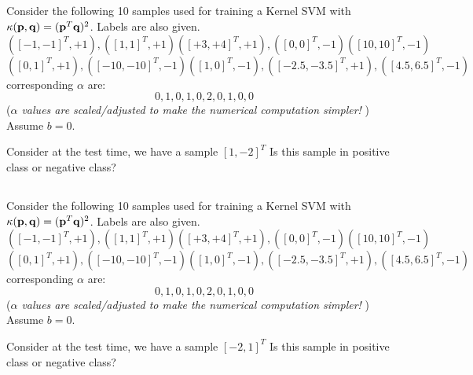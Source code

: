 \begin{frame}
\section{}
Consider the following 10 samples used for training a Kernel SVM with $\kappa({\bf p}, {\bf q}) = ({\bf p}^T{\bf q})^2$.  Labels are also given.
\[ ([-1,-1]^T,+1), ([1,1]^T, +1) ([+3,+4]^T, +1), ([0,0]^T,-1) ([10,10]^T,-1) \]
\[ ([0,1]^T,+1), ([-10,-10]^T,-1) ([1,0]^T,-1),([-2.5,-3.5]^T,+1), ([4.5,6.5]^T,-1) \]
corresponding $\alpha$ are:
\[ 0,1,0,1,0,2,0,1,0,0\]
({\em $\alpha$ values are scaled/adjusted to make the numerical computation simpler!} )
Assume $b=0$.

Consider at the test time, we have a sample $[1, -2]^T$
Is this sample in positive class or negative class?



\end{frame}


\begin{frame}
\section{}
Consider the following 10 samples used for training a Kernel SVM with $\kappa({\bf p}, {\bf q}) = ({\bf p}^T{\bf q})^2$.  Labels are also given.
\[ ([-1,-1]^T,+1), ([1,1]^T, +1) ([+3,+4]^T, +1), ([0,0]^T,-1) ([10,10]^T,-1) \]
\[ ([0,1]^T,+1), ([-10,-10]^T,-1) ([1,0]^T,-1),([-2.5,-3.5]^T,+1), ([4.5,6.5]^T,-1) \]
corresponding $\alpha$ are:
\[ 0,1,0,1,0,2,0,1,0,0\]
({\em $\alpha$ values are scaled/adjusted to make the numerical computation simpler!} )
Assume $b=0$.

Consider at the test time, we have a sample $[-2, 1]^T$
Is this sample in positive class or negative class?

\end{frame}
